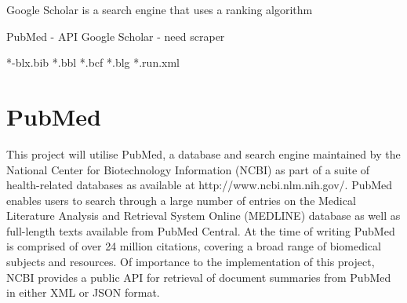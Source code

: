 \documentclass[PROP_AGutteridge_CS.tex]{subfiles}
\begin{document}
Google Scholar is a search engine that uses a ranking algorithm

PubMed - API
Google Scholar - need scraper
 
 *-blx.bib
 *.bbl
 *.bcf
 *.blg
 *.run.xml

\section{PubMed}
This project will utilise PubMed, a database and search engine maintained by the National Center for Biotechnology Information (NCBI) as part of a suite of health-related databases as available at http://www.ncbi.nlm.nih.gov/. PubMed enables users to search through a large number of entries on the Medical Literature Analysis and Retrieval System Online (MEDLINE) database as well as full-length texts available from PubMed Central. At the time of writing PubMed is comprised of over 24 million citations, covering a broad range of biomedical subjects and resources. Of importance to the implementation of this project, NCBI provides a public API for retrieval of document summaries from PubMed in either XML or JSON format. \\
\newline

\end{document}
